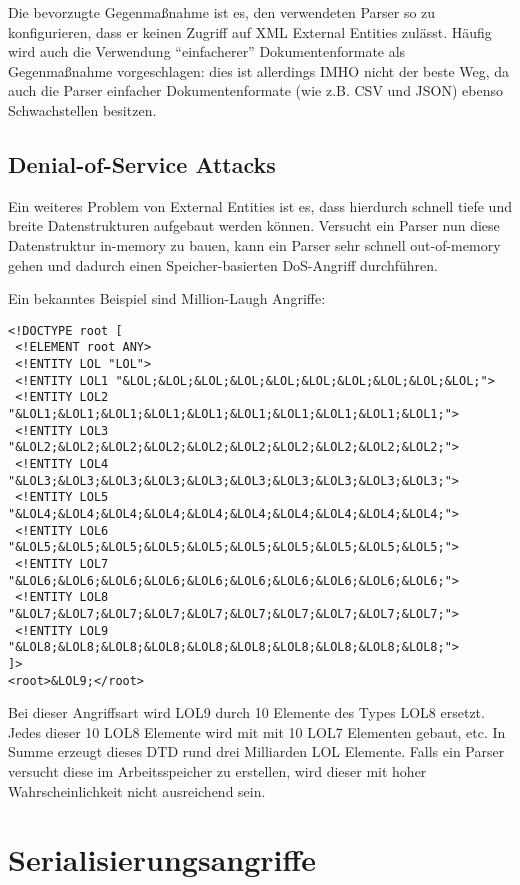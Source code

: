 Die bevorzugte Gegenmaßnahme ist es, den verwendeten Parser so zu konfigurieren, dass er keinen Zugriff auf XML External Entities zulässt. Häufig wird auch die Verwendung ``einfacherer'' Dokumentenformate als Gegenmaßnahme vorgeschlagen: dies ist allerdings IMHO nicht der beste Weg, da auch die Parser einfacher Dokumentenformate (wie z.B. CSV und JSON) ebenso Schwachstellen besitzen.

\subsection{Denial-of-Service Attacks}

Ein weiteres Problem von External Entities ist es, dass hierdurch schnell tiefe und breite Datenstrukturen aufgebaut werden können. Versucht ein Parser nun diese Datenstruktur in-memory zu bauen, kann ein Parser sehr schnell out-of-memory gehen und dadurch einen Speicher-basierten DoS-Angriff durchführen.

Ein bekanntes Beispiel sind Million-Laugh Angriffe:

\begin{verbatim}
<!DOCTYPE root [
 <!ELEMENT root ANY>
 <!ENTITY LOL "LOL">
 <!ENTITY LOL1 "&LOL;&LOL;&LOL;&LOL;&LOL;&LOL;&LOL;&LOL;&LOL;&LOL;">
 <!ENTITY LOL2 "&LOL1;&LOL1;&LOL1;&LOL1;&LOL1;&LOL1;&LOL1;&LOL1;&LOL1;&LOL1;">
 <!ENTITY LOL3 "&LOL2;&LOL2;&LOL2;&LOL2;&LOL2;&LOL2;&LOL2;&LOL2;&LOL2;&LOL2;">
 <!ENTITY LOL4 "&LOL3;&LOL3;&LOL3;&LOL3;&LOL3;&LOL3;&LOL3;&LOL3;&LOL3;&LOL3;">
 <!ENTITY LOL5 "&LOL4;&LOL4;&LOL4;&LOL4;&LOL4;&LOL4;&LOL4;&LOL4;&LOL4;&LOL4;">
 <!ENTITY LOL6 "&LOL5;&LOL5;&LOL5;&LOL5;&LOL5;&LOL5;&LOL5;&LOL5;&LOL5;&LOL5;">
 <!ENTITY LOL7 "&LOL6;&LOL6;&LOL6;&LOL6;&LOL6;&LOL6;&LOL6;&LOL6;&LOL6;&LOL6;">
 <!ENTITY LOL8 "&LOL7;&LOL7;&LOL7;&LOL7;&LOL7;&LOL7;&LOL7;&LOL7;&LOL7;&LOL7;">
 <!ENTITY LOL9 "&LOL8;&LOL8;&LOL8;&LOL8;&LOL8;&LOL8;&LOL8;&LOL8;&LOL8;&LOL8;"> 
]>
<root>&LOL9;</root>
\end{verbatim}

Bei dieser Angriffsart wird LOL9 durch 10 Elemente des Types LOL8 ersetzt. Jedes dieser 10 LOL8 Elemente wird mit mit 10 LOL7 Elementen gebaut, etc. In Summe erzeugt dieses DTD rund drei Milliarden LOL Elemente. Falls ein Parser versucht diese im Arbeitsspeicher zu erstellen, wird dieser mit hoher Wahrscheinlichkeit nicht ausreichend sein.

\section{Serialisierungsangriffe}

